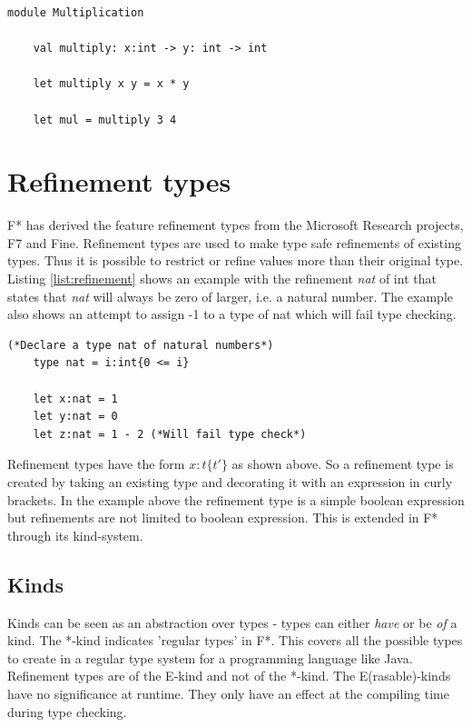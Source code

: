 \documentclass[twosided]{report}
\begin{document}
\begin{lstlisting}[style=fstar, caption={Multiplication example in F*}, label={list:multiply}]
	module Multiplication

	val multiply: x:int -> y: int -> int
	
	let multiply x y = x * y
	
	let mul = multiply 3 4
\end{lstlisting}

\section{Refinement types}
F* has derived the feature refinement types from the Microsoft Research projects, F7 and Fine. Refinement types are used to make type safe refinements of existing types. Thus it is possible to restrict or refine values more than their original type. Listing \ref{list:refinement} shows an example with the refinement \emph{nat} of int that states that \emph{nat} will always be zero of larger, i.e. a natural number. The example also shows an attempt to assign -1 to a type of nat which will fail type checking.
\clearpage
\begin{lstlisting}[style=fstar, caption={Simple refinement types in F*}, label={list:refinement}]
	(*Declare a type nat of natural numbers*)	
	type nat = i:int{0 <= i}
	
	let x:nat = 1
	let y:nat = 0
	let z:nat = 1 - 2 (*Will fail type check*)
\end{lstlisting}

Refinement types have the form $x:t\{t'\}$ as shown above. So a refinement type is created by taking an existing type and decorating it with an expression in curly brackets. In the example above the refinement type is a simple boolean expression but refinements are not limited to boolean expression. This is extended in F* through its kind-system.

\subsection{Kinds}
Kinds can be seen as an abstraction over types - types can either \emph{have} or be \emph{of} a kind. The *-kind indicates 'regular types' in F*. This covers all the possible types to create in a regular type system for a programming language like Java. Refinement types are of the E-kind and not of the *-kind. The E(rasable)-kinds have no significance at runtime. They only have an effect at the compiling time during type checking.
\end{document}
